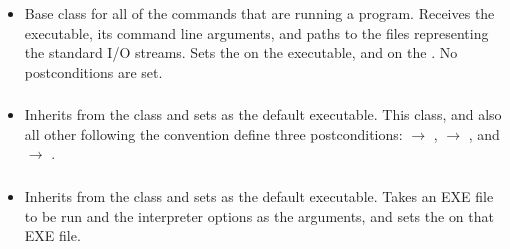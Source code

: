 \subsubsection*{}\label{subsec:Run}

\begin{itemize}[label={}]
    \item Base class for all of the commands that are running a program.
          Receives the executable, its command line arguments, and paths to the files representing the standard I/O
          streams.
          Sets the \hyperref[subsec:ProgramExistsPrerequisite]{} on the
          executable, and \hyperref[subsec:FileExistsPrerequisite]{} on the
          .
          No postconditions are set.
\end{itemize}

\subsubsection*{}\label{subsec:RunSolution}

\begin{itemize}[label={}]
    \item Inherits from the \hyperref[subsec:Run]{} class and sets  as the default
          executable.
          This class, and also all other following the  convention define three postconditions:
          \hyperref[subsec:UsedTimePostcondition]{} $\rightarrow$ ,
          \hyperref[subsec:UsedMemoryPostcondition]{} $\rightarrow$ , and
          \hyperref[subsec:ExitCodePostcondition]{} $\rightarrow$ .
\end{itemize}

\subsubsection*{}\label{subsec:RunCSharp}

\begin{itemize}[label={}]
    \item Inherits from the \hyperref[subsec:Run]{} class and sets  as the default
          executable.
          Takes an EXE file to be run and the interpreter options as the arguments, and sets the
          \hyperref[subsec:FileExistsPrerequisite]{} on that EXE file.
\end{itemize}

